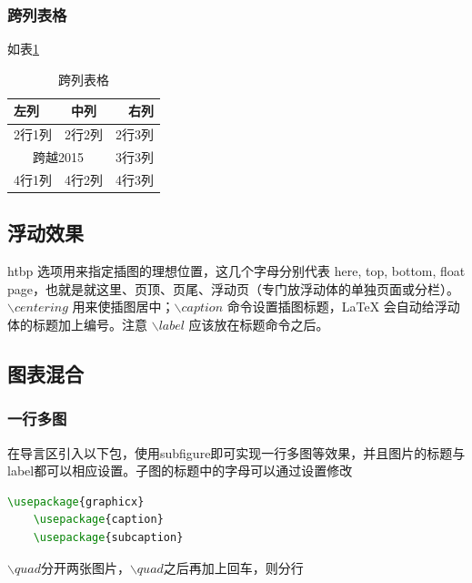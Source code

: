 \subsubsection{跨列表格}
如表\ref{tab:mytab3}
\begin{table}[htbp]
    \centering
    \begin{tabular}{|l|c|r|}
      \hline
      左列 & 中列 & 右列 \\
      \hline
      2行1列 & 2行2列 & 2行3列 \\
      \hline
      \multicolumn{2}{|c|}{跨越2015} & 3行3列 \\
      \hline
      4行1列 & 4行2列 & 4行3列 \\
      \hline
    \end{tabular}
    \caption{跨列表格}
    \label{tab:mytab3}
\end{table}

\subsection{浮动效果}
 htbp 选项用来指定插图的理想位置，这几个字母分别代表 here, top, bottom, float page，也就是就这里、页顶、页尾、浮动页（专门放浮动体的单独页面或分栏）。$\backslash centering$ 用来使插图居中；$\backslash caption$ 命令设置插图标题，LaTeX 会自动给浮动体的标题加上编号。注意 $\backslash label$ 应该放在标题命令之后。

\subsection{图表混合}
\subsubsection{一行多图}
在导言区引入以下包，使用subfigure即可实现一行多图等效果，并且图片的标题与label都可以相应设置。子图的标题中的字母可以通过设置修改
\begin{lstlisting}[language={TeX}]
    \usepackage{graphicx}
    \usepackage{caption}
    \usepackage{subcaption}
\end{lstlisting}
$\backslash quad$分开两张图片，$\backslash quad$之后再加上回车，则分行

